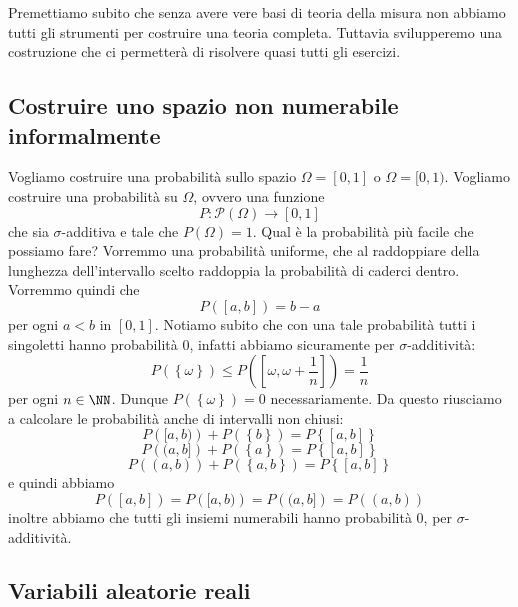 \documentclass[11pt]{scrartcl}
\newcommand{\parti}[1]{\mathcal{P}\!\left(#1\right)}
\begin{document}
	Premettiamo subito che senza avere vere basi di teoria della misura non abbiamo tutti gli strumenti per costruire una teoria completa. Tuttavia svilupperemo una costruzione che ci permetterà di risolvere quasi tutti gli esercizi. 
	\subsection{Costruire uno spazio non numerabile informalmente}
	
	Vogliamo costruire una probabilità sullo spazio $\Omega=[0,1]$ o $\Omega=[0,1)$. Vogliamo costruire una probabilità su $\Omega$, ovvero una funzione
	$$P:\parti{\Omega}\to [0,1]$$
	che sia $\sigma$-additiva e tale che $P(\Omega)=1$. Qual è la probabilità più facile che possiamo fare? Vorremmo una probabilità uniforme, che al raddoppiare della lunghezza dell'intervallo scelto raddoppia la probabilità di caderci dentro. Vorremmo quindi che
	$$P\left([a,b]\right)=b-a$$
	per ogni $a<b$ in $[0,1]$. Notiamo subito che con una tale probabilità tutti i singoletti hanno probabilità $0$, infatti abbiamo sicuramente per $\sigma$-additività:
	$$P\left(\left\{\omega\right\}\right)\le P\left(\left[\omega,\omega+\frac{1}{n}\right]\right)=\frac{1}{n}$$
	per ogni $n\in\NN$. Dunque $P(\left\{\omega\right\})=0$ necessariamente. Da questo riusciamo a calcolare le probabilità anche di intervalli non chiusi:
	$$P\left([a,b)\right)+P\left(\left\{b\right\}\right)=P\left\{\left[a,b\right]\right\}$$
	$$P\left((a,b]\right)+P\left(\left\{a\right\}\right)=P\left\{\left[a,b\right]\right\}$$
	$$P\left((a,b)\right)+P\left(\left\{a,b\right\}\right)=P\left\{\left[a,b\right]\right\}$$
	e quindi abbiamo
	$$P\left([a,b]\right)=P\left([a,b)\right)=P\left((a,b]\right)=P\left((a,b)\right)$$
	inoltre abbiamo che tutti gli insiemi numerabili hanno probabilità $0$, per $\sigma$-additività.
	\subsection{Variabili aleatorie reali}
	
\end{document}
